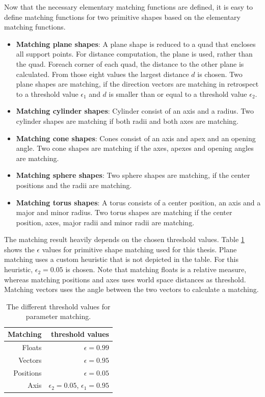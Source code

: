 Now that the necessary elementary matching functions are defined, it is easy to define matching functions for two primitive shapes based on the elementary matching functions. 

\begin{itemize}
\item \textbf{Matching plane shapes}: 
A plane shape is reduced to a quad that encloses all support points. For distance computation, the plane is used, rather than the quad. 
Foreach corner of each quad, the distance to the other plane is calculated. From those eight values the largest distance $d$ is chosen. Two plane shapes are matching, if the direction vectors are matching in retrospect to a threshold value $\epsilon_1$ and $d$ is smaller than or equal to a threshold value $\epsilon_2$.
\item \textbf{Matching cylinder shapes}: 
Cylinder consist of an axis and a radius. Two cylinder shapes are matching if both radii and both axes are matching. 
\item \textbf{Matching cone shapes}:
Cones consist of an axis and apex and an opening angle. Two cone shapes are matching if the axes, apexes and opening angles are matching. 
\item \textbf{Matching sphere shapes}: 
Two sphere shapes are matching, if the center positions and the radii are matching. 
\item \textbf{Matching torus shapes}: 
A torus consists of a center position, an axis and a major and minor radius. Two torus shapes are matching if the center position, axes, major radii and minor radii are matching. 
\end{itemize}

The matching result heavily depends on the chosen threshold values. Table \ref{tab:matchingThresholds} shows the $\epsilon$ values for primitive shape matching used for this thesis. Plane matching uses a custom heuristic that is not depicted in the table. For this heuristic, $\epsilon_2 = 0.05$ is chosen. Note that matching floats is a relative measure, whereas matching positions and axes uses world space distances as threshold. Matching vectors uses the angle between the two vectors to calculate a matching. 

\begin{table}
\centering
\begin{tabular}{ r | r }
	Matching	& threshold values \\
	\hline
  Floats 		& $\epsilon = 0.99$ \\
	Vectors 	& $\epsilon = 0.95$ \\
  Positions & $\epsilon = 0.05$ \\ 
	Axis 			& $\epsilon_2 = 0.05$, $\epsilon_1 = 0.95$ \\  

\end{tabular}
\caption{The different threshold values for parameter matching.}
\label{tab:matchingThresholds}
\end{table}


